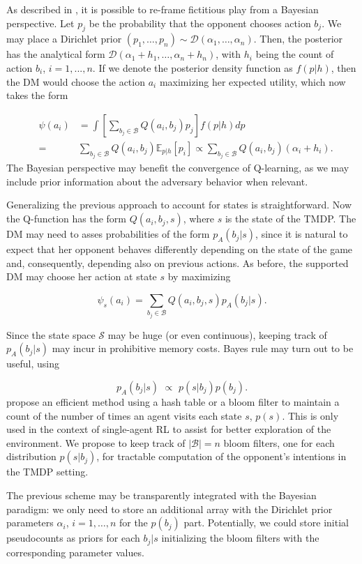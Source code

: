 \documentclass[letterpaper]{article} %
\begin{document}
As described in \cite{rios1}, it is possible to re-frame fictitious play from a Bayesian perspective. Let $p_j$ be the probability that the opponent chooses action $b_j$. We may place a Dirichlet prior $(p_1 , \ldots, p_n) \sim \mathcal{D}(\alpha_1,\ldots,\alpha_n)$. Then, the posterior has the analytical form $\mathcal{D}(\alpha_1 + h_1,\ldots,\alpha_n + h_n)$, with  $h_i$ being the count of action $b_i$, $i=1,...,n$. If we denote the posterior density function as $f(p|h)$, then the DM would choose the action $a_i$ maximizing her expected utility, which now takes the form

\begin{eqnarray*}
& \psi(a_i) & = \int \left[\sum_{b_j \in \mathcal{B}} Q(a_i, b_j) p_j\right] f(p|h) dp \\
&=& \sum_{b_j \in \mathcal{B}} Q(a_i, b_j) \mathbb{E}_{p|h}[p_i] \propto  \sum_{b_j \in \mathcal{B}} Q(a_i, b_j) (\alpha_i + h_i).
\end{eqnarray*}
The Bayesian perspective may benefit the convergence of Q-learning, as we may include prior information about the adversary behavior when relevant.

Generalizing the previous approach to account for states is straightforward. Now the Q-function has the form $Q(a_i, b_j, s)$, where $s$ is the state of the TMDP. The DM may need to asses probabilities of the form $p_A(b_j | s)$, since it is natural to expect that her opponent behaves differently depending on the state of the game and, consequently, depending also on previous actions. As before, the supported DM may choose her action at state $s$ by maximizing

\[ \psi_s(a_i) = \sum_{b_j \in \mathcal{B}} Q(a_i, b_j,s) p_{A}(b_j|s).  \]


Since the state space $\mathcal{S}$ may be huge (or even continuous), keeping track of $p_A(b_j|s)$ may incur in prohibitive memory costs. Bayes rule may turn out to be useful, using

\[
p_{A}(b_j| s) \,\, \propto \,\, p(s| b_j)p(b_j).
\]
\cite{tang2017exploration} propose an efficient method using a hash table or a bloom filter to maintain a count of the number of times an agent visits each state $s$, $p(s)$. This is only used in the context of single-agent RL to assist for better exploration of the environment. We propose to keep track of $|\mathcal{B}| = n$ bloom filters, one for each distribution $p(s|b_j)$, for tractable computation of the opponent's intentions in the TMDP setting.

The previous scheme may be transparently integrated with the Bayesian paradigm: we only need to store an additional array with the Dirichlet prior parameters $\alpha_i$, $i=1,\ldots, n$ 
for the $p(b_j)$ part. Potentially, we could store initial pseudocounts as priors for each $b_j | s$ initializing the bloom filters with the corresponding parameter values.
\end{document}
